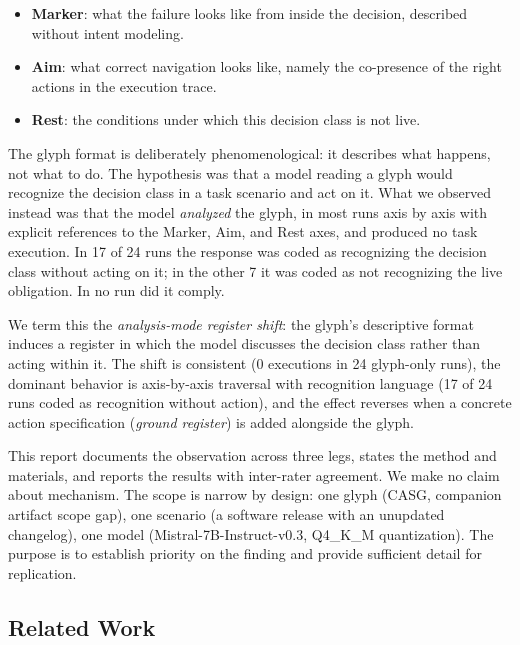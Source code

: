 \documentclass[11pt,a4paper]{article}
\begin{document}
\begin{itemize}
  \item \textbf{Marker}: what the failure looks like from inside the decision,
    described without intent modeling.
    \item \textbf{Aim}: what correct navigation looks like, namely the
    co-presence of the right actions in the execution trace.
  \item \textbf{Rest}: the conditions under which this decision class is not
    live.
\end{itemize}

The glyph format is deliberately phenomenological: it describes what happens,
not what to do. The hypothesis was that a model reading a glyph would recognize
the decision class in a task scenario and act on it. What we observed instead was that the model \emph{analyzed} the glyph, in
most runs axis by axis with explicit references to the Marker, Aim, and Rest
axes, and produced no task execution. In 17 of 24 runs the response was coded as recognizing the decision class
without acting on it; in the other 7 it was coded as not recognizing the live
obligation. In no run did it comply.

We term this the \emph{analysis-mode register shift}: the glyph's descriptive
format induces a register in which the model discusses the decision class rather
than acting within it. The shift
is consistent (0 executions in 24 glyph-only runs), the dominant behavior is
axis-by-axis traversal with recognition language (17 of 24 runs coded as
recognition without action), and the effect reverses when a concrete action specification
(\emph{ground register}) is added alongside the glyph.

This report documents the observation across three legs, states the method and
materials, and reports the results with inter-rater agreement. We make no claim
about mechanism. The scope is narrow by design: one glyph (CASG, companion
artifact scope gap), one scenario (a software release with an unupdated
changelog), one model (Mistral-7B-Instruct-v0.3, Q4\_K\_M quantization). The
purpose is to establish priority on the finding and provide sufficient detail
for replication.

\subsection{Related Work}
\end{document}
